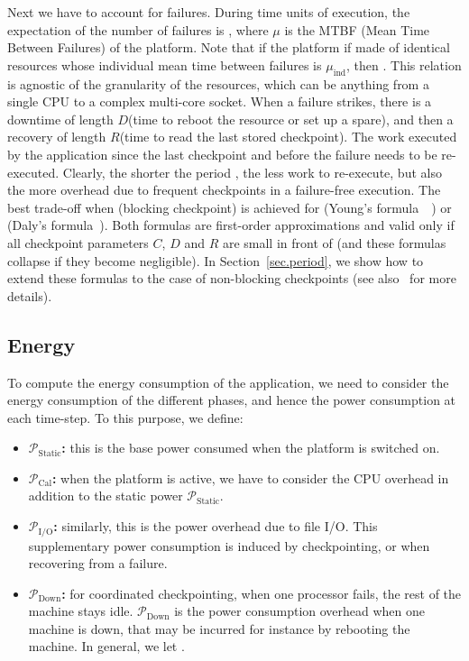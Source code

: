 \documentclass[a4paper]{article}
\newcommand{\ema}[1]{\ensuremath{#1}\xspace}
\newcommand{\mtbf}{\ema{\mu}}
\newcommand{\mtbfind}{\ema{\mu_{\text{ind}}}}
\newcommand{\ccc}{\ema{C}}
\newcommand{\rrr}{\ema{R}}
\newcommand{\ddd}{\ema{D}}
\newcommand{\power}[1][]{\ema{\mathcal{P}_{\text{#1}}}}
\newcommand{\pCal}{\power[Cal]}
\newcommand{\pIO}{\power[I/O]}
\newcommand{\pDown}{\power[Down]}
\newcommand{\pIdle}{\power[Static]}
\begin{document}
Next we have to account for failures. During  time units of
execution, the expectation of the number of failures is
, where \mtbf is the MTBF (Mean Time Between Failures) of
the platform.  Note that if the platform if made of  identical
resources whose individual mean time between failures is \mtbfind,
then . This relation is agnostic of
the granularity of the resources, which can be anything from a single
CPU to a complex multi-core socket. When a failure strikes,
there is a downtime of length \ddd (time to reboot the resource or set
up a spare), and then a recovery of length \rrr (time to read the last stored checkpoint).
The work executed by the application since the last checkpoint and before the failure needs 
to be re-executed. Clearly, the shorter the period , the less work to re-execute, but also
the more overhead due to frequent checkpoints in a failure-free execution. The best trade-off 
when  (blocking checkpoint) is achieved for 
(Young's formula~~\cite{young74}) or  
(Daly's formula~\cite{daly04}).
Both formulas are first-order approximations and valid only if all checkpoint parameters \ccc, \ddd and \rrr
are small in front of  (and these formulas collapse if they become negligible).
In Section~\ref{sec.period}, we show how to extend these formulas to the case of non-blocking checkpoints (see
also~\cite{ccpe-2012-ckpt} for more details).

\subsection{Energy}
\label{sec.model.energy}

To compute the energy consumption of the application, we need to consider the energy 
consumption of the different phases, and hence the power consumption at each time-step. 
To this purpose,  we define:
\begin{itemize}
	\item {\bf \pIdle:} this is the base power consumed when the platform is switched on.
	\item {\bf \pCal:} when the platform is active, we have to consider the CPU overhead in addition to the static power \pIdle.  
	\item {\bf \pIO:} similarly, this is the power overhead due to file I/O. This supplementary power   
consumption is induced by checkpointing, or when recovering from a failure.
	\item {\bf \pDown:} for coordinated checkpointing, when one processor fails, the rest of the
machine stays idle. \pDown is the power consumption overhead when one machine is down, that may be incurred for instance by rebooting the machine. In general, we let .
\end{itemize}
\end{document}
